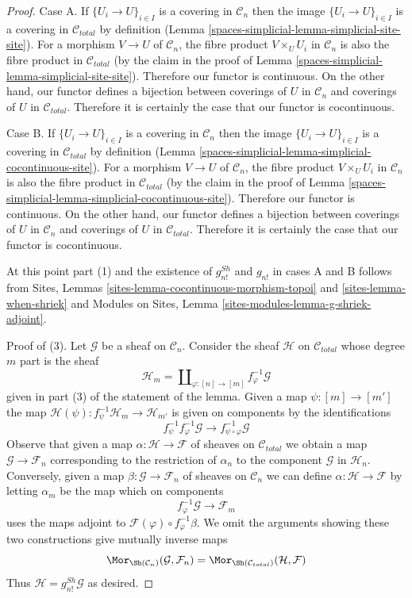 \begin{proof}
Case A. If $\{U_i \to U\}_{i \in I}$ is a covering in $\mathcal{C}_n$
then the image $\{U_i \to U\}_{i \in I}$ is a covering in $\mathcal{C}_{total}$
by definition (Lemma \ref{spaces-simplicial-lemma-simplicial-site-site}). For a morphism
$V \to U$ of $\mathcal{C}_n$, the fibre product
$V \times_U U_i$ in $\mathcal{C}_n$ is also
the fibre product in $\mathcal{C}_{total}$ (by the claim in the
proof of Lemma \ref{spaces-simplicial-lemma-simplicial-site-site}).
Therefore our functor is continuous. On the other hand, our functor
defines a bijection between coverings of $U$ in $\mathcal{C}_n$
and coverings of $U$ in $\mathcal{C}_{total}$. Therefore it is
certainly the case that our functor is cocontinuous.

\medskip\noindent
Case B. If $\{U_i \to U\}_{i \in I}$ is a covering in $\mathcal{C}_n$
then the image $\{U_i \to U\}_{i \in I}$ is a covering in $\mathcal{C}_{total}$
by definition (Lemma \ref{spaces-simplicial-lemma-simplicial-cocontinuous-site}). For a morphism
$V \to U$ of $\mathcal{C}_n$, the fibre product
$V \times_U U_i$ in $\mathcal{C}_n$ is also
the fibre product in $\mathcal{C}_{total}$ (by the claim in the
proof of Lemma \ref{spaces-simplicial-lemma-simplicial-cocontinuous-site}).
Therefore our functor is continuous. On the other hand, our functor
defines a bijection between coverings of $U$ in $\mathcal{C}_n$
and coverings of $U$ in $\mathcal{C}_{total}$. Therefore it is
certainly the case that our functor is cocontinuous.

\medskip\noindent
At this point part (1) and the existence of $g^{Sh}_{n!}$ and $g_{n!}$
in cases A and B follows from
Sites, Lemmas \ref{sites-lemma-cocontinuous-morphism-topoi} and
\ref{sites-lemma-when-shriek}
and
Modules on Sites, Lemma \ref{sites-modules-lemma-g-shriek-adjoint}.

\medskip\noindent
Proof of (3). Let $\mathcal{G}$ be a sheaf on $\mathcal{C}_n$.
Consider the sheaf $\mathcal{H}$ on $\mathcal{C}_{total}$
whose degree $m$ part is the sheaf
$$
\mathcal{H}_m = \coprod\nolimits_{\varphi : [n] \to [m]}
f_\varphi^{-1}\mathcal{G}
$$
given in part (3) of the statement of the lemma.
Given a map $\psi : [m] \to [m']$ the map
$\mathcal{H}(\psi) : f_\psi^{-1}\mathcal{H}_m \to \mathcal{H}_{m'}$
is given on components by the identifications
$$
f_\psi^{-1} f_\varphi^{-1} \mathcal{G} \to
f_{\psi \circ \varphi}^{-1}\mathcal{G}
$$
Observe that given a map $\alpha : \mathcal{H} \to \mathcal{F}$
of sheaves on $\mathcal{C}_{total}$ we obtain a map
$\mathcal{G} \to \mathcal{F}_n$
corresponding to the restriction of $\alpha_n$ to the component
$\mathcal{G}$ in $\mathcal{H}_n$. Conversely, given a map
$\beta : \mathcal{G} \to \mathcal{F}_n$ of sheaves on $\mathcal{C}_n$
we can define
$\alpha : \mathcal{H} \to \mathcal{F}$ by letting $\alpha_m$
be the map which on components
$$
f_\varphi^{-1}\mathcal{G} \to \mathcal{F}_m
$$
uses the maps adjoint to $\mathcal{F}(\varphi) \circ f_\varphi^{-1}\beta$.
We omit the arguments showing these two constructions give
mutually inverse maps
$$
\Mor_{\Sh(\mathcal{C}_n)}(\mathcal{G}, \mathcal{F}_n) =
\Mor_{\Sh(\mathcal{C}_{total})}(\mathcal{H}, \mathcal{F})
$$
Thus $\mathcal{H} = g^{Sh}_{n!}\mathcal{G}$ as desired.


\end{proof}

